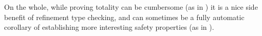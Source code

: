 
On the whole, while proving totality can be cumbersome 
(as in \lbhscolour) it is a nice side benefit of refinement
type checking, and can sometimes be a fully automatic corollary
of establishing more interesting safety properties (as in \lbmap).
